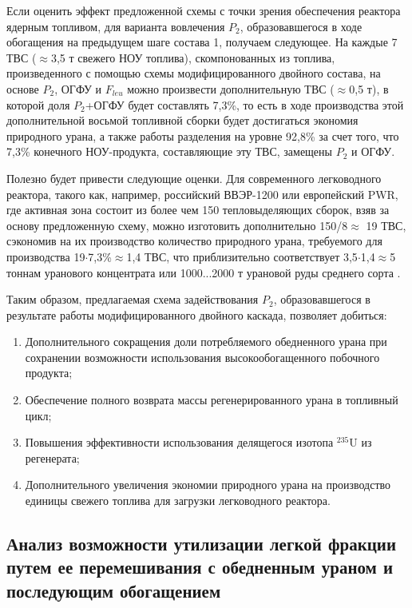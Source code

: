 {Если оценить эффект предложенной схемы с точки зрения обеспечения реактора ядерным топливом, для варианта вовлечения $P_2$, образовавшегося в ходе обогащения на предыдущем шаге состава 1, получаем следующее. На каждые 7 ТВС ($\approx$3,5 т свежего НОУ топлива), скомпонованных из топлива, произведенного с помощью схемы модифицированного двойного состава, на основе $P_2$, ОГФУ и $F_{leu}$ можно произвести дополнительную ТВС ($\approx$0,5 т), в которой доля $P_2$+ОГФУ будет составлять 7,3\%, то есть в ходе производства этой дополнительной восьмой топливной сборки будет достигаться экономия природного урана, а также работы разделения на уровне 92,8\% за счет того, что 7,3\% конечного НОУ-продукта, составляющие эту ТВС, замещены $P_2$ и ОГФУ.

Полезно будет привести следующие оценки. Для современного легководного реактора, такого как, например, российский ВВЭР-1200 или европейский PWR, где активная зона состоит из более чем 150 тепловыделяющих сборок, взяв за основу предложенную схему, можно изготовить дополнительно 150/8$\approx$ 19 ТВС, сэкономив на их производство количество природного урана, требуемого для производства 19$\cdot$7,3\%$\approx$1,4 ТВС, что приблизительно соответствует 3,5$\cdot$1,4$\approx$5 тоннам уранового концентрата или 1000...2000 т урановой руды среднего сорта \cite{bekmanYaDERNAYaFIZIKA}.

Таким образом, предлагаемая схема задействования $P_2$, образовавшегося в результате работы модифицированного двойного каскада, позволяет добиться:
\begin{enumerate}
  \item Дополнительного сокращения доли потребляемого обедненного урана при сохранении возможности использования высокообогащенного побочного продукта;
  \item Обеспечение полного возврата массы регенерированного урана в топливный цикл;
  \item Повышения эффективности использования делящегося изотопа $^{235}$U из регенерата;
  \item Дополнительного увеличения экономии природного урана на производство единицы свежего топлива для загрузки легководного реактора.
\end{enumerate}

\subsection{Анализ возможности утилизации легкой фракции путем ее перемешивания с обедненным ураном и последующим обогащением}\label{triple_c}
}
